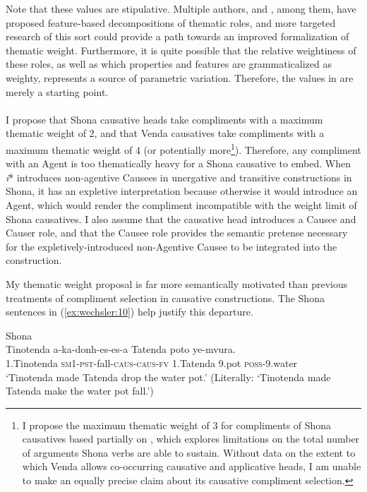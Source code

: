 \documentclass[output=paper,modfonts,nonflat,colorlinks,citecolor=brown]{langsci/langscibook}
\begin{document}
Note that these values are stipulative. Multiple authors, \citet{Wunderlich1997} and \citet{Mylne1999}, among them, have proposed feature-based decompositions of thematic roles, and more targeted research of this sort could provide a path towards an improved formalization of thematic weight. Furthermore, it is quite possible that the relative weightiness of these roles, as well as which properties and features are grammaticalized as weighty, represents a source of parametric variation. Therefore, the values in  are merely a starting point.\\
\\
I propose that Shona causative heads take compliments with a maximum thematic weight of 2, and that Venda causatives take compliments with a maximum thematic weight of 4 (or potentially more\footnote{I propose the maximum thematic weight of 3 for compliments of Shona causatives based partially on \citet{Wechsler2014}, which explores limitations on the total number of arguments Shona verbs are able to sustain. Without data on the extent to which Venda allows co-occurring causative and applicative heads, I am unable to make an equally precise claim about its causative compliment selection.}). Therefore, any compliment with an Agent is too thematically heavy for a Shona causative to embed. When \textit{i}* introduces non-agentive Causees in unergative and transitive constructions in Shona, it has an expletive interpretation because otherwise it would introduce an Agent, which would render the compliment incompatible with the weight limit of Shona causatives. I also assume that the causative head introduces a Causee and Causer role, and that the Causee role provides the semantic pretense necessary for the expletively-introduced non-Agentive Causee to be integrated into the construction.



My thematic weight proposal is far more semantically motivated than previous treatments of compliment selection in causative constructions. The Shona sentences in (\ref{ex:wechsler:10}) help justify this departure.


\ea\label{ex:wechsler:10}
Shona\\
\ea\label{ex:wechsler:10a}
\gll Tinotenda {a-ka-donh-es-es-a}  {{Tatenda}}  {{poto}} {ye-mvura}.\\
 1.Tinotenda  \textsc{sm}1-\textsc{pst}{}-fall-\textsc{caus}{}-\textsc{caus}{}-\textsc{fv}  {1.Tatenda}  {9.pot}  \textsc{poss}{}-9.water\\
\glt `Tinotenda made Tatenda drop the water pot.’
(Literally: ‘Tinotenda made Tatenda make the water pot fall.’)\\
\end{document}
